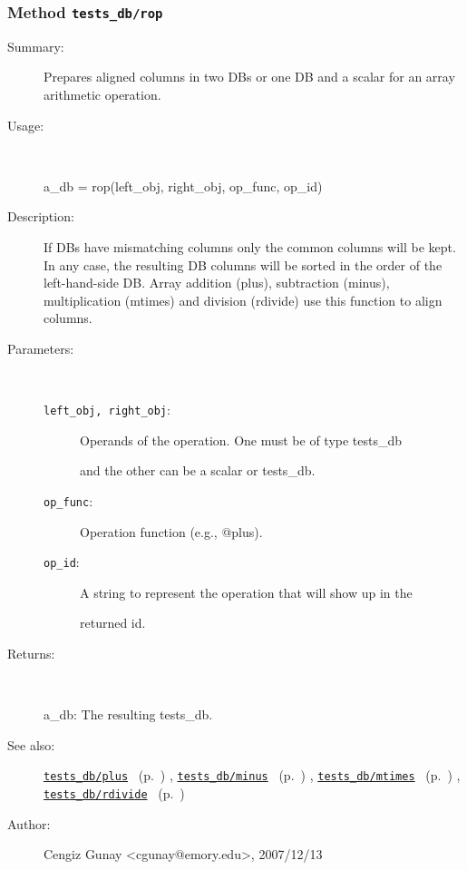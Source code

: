 \subsubsection[Method \texttt{rop}]{Method \texttt{tests\_db/rop}}%
%
\label{ref_tests_db__rop}%
\hypertarget{ref_tests_db__rop}{}%
\begin{description}
\item[Summary:]Prepares aligned columns in two DBs or one DB and a scalar for an array arithmetic operation.
%
\item[Usage:]~%
\begin{lyxcode}%
a\_db = rop(left\_obj, right\_obj, op\_func, op\_id)
%
\end{lyxcode}%
%
\item[Description:]%
If DBs have mismatching columns only the common columns will be kept.
 In any case, the resulting DB columns will be sorted in the order of the
 left-hand-side DB. Array addition (plus), subtraction (minus),
 multiplication (mtimes) and division (rdivide) use this function to
 align columns.
\item[Parameters:]~
\begin{description}%
\item[\texttt{left\_obj, right\_obj}:]
 Operands of the operation. One must be of type tests\_db

and the other can be a scalar or tests\_db.
\item[\texttt{op\_func}:]
 Operation function (e.g., @plus).
\item[\texttt{op\_id}:]
 A string to represent the operation that will show up in the

returned id.
\end{description}%
%
\item[Returns:
]~

   a\_db: The resulting tests\_db.
%
%
\item[See also:]%
\hyperlink{ref_tests_db__plus}{\texttt{tests\_db/plus}}%
\ (p.~\pageref{ref_tests_db__plus})%
%
, \hyperlink{ref_tests_db__minus}{\texttt{tests\_db/minus}}%
\ (p.~\pageref{ref_tests_db__minus})%
%
, \hyperlink{ref_tests_db__mtimes}{\texttt{tests\_db/mtimes}}%
\ (p.~\pageref{ref_tests_db__mtimes})%
%
, \hyperlink{ref_tests_db__rdivide}{\texttt{tests\_db/rdivide}}%
\ (p.~\pageref{ref_tests_db__rdivide})%
%
%
\item[Author:]%
Cengiz Gunay <cgunay@emory.edu>, 2007/12/13
%
\end{description}
\methodline%
